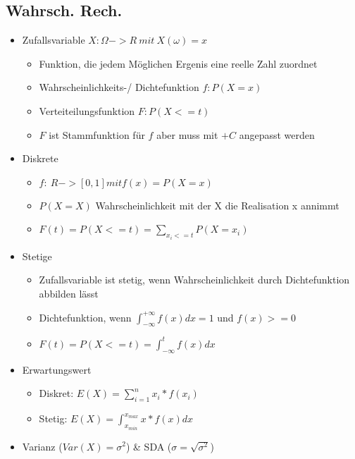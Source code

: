 \documentclass[a4paper]{article}
\begin{document}
\begin{landscape}
\begin{multicols}{4}
    \section{Wahrsch. Rech.}
    \begin{itemize}[noitemsep,nolistsep,leftmargin=*]
        \item Zufallsvariable $X : \Omega -> R\: mit\: X(\omega) = x$
        \begin{itemize}[noitemsep,nolistsep,leftmargin=*]
            \item Funktion, die jedem Möglichen Ergenis eine reelle Zahl zuordnet
            \item Wahrscheinlichkeits-/ Dichtefunktion $f: P(X =x)$
            \item Verteiteilungsfunktion $F: P(X <= t)$
            \item $F$ ist Stammfunktion für $f$ aber muss mit $+C$ angepasst werden
        \end{itemize}
        \item Diskrete
        \begin{itemize}[noitemsep,nolistsep,leftmargin=*]
            \item $f: \:R->[0,1] mit f(x)=P(X=x)$
            \item $P(X=X)$ Wahrscheinlichkeit mit der X die Realisation x annimmt
            \item $F(t) = P(X <= t) = \sum_{x_i <= t} P(X = x_i)$
        \end{itemize}
        \item Stetige
        \begin{itemize}[noitemsep,nolistsep,leftmargin=*]
            \item Zufallsvariable ist stetig, wenn Wahrscheinlichkeit durch Dichtefunktion abbilden lässt
            \item Dichtefunktion, wenn $\int^{+\infty}_{-\infty} f(x) dx = 1$ und $f(x) >= 0$
            \item $F(t) = P(X <= t) = \int^{t}_{-\infty} f(x)dx$
        \end{itemize}
        \item Erwartungswert
        \begin{itemize}[noitemsep,nolistsep,leftmargin=*]
            \item Diskret: $E(X) = \sum^n_{i=1} x_i * f(x_i)$
            \item Stetig: $E(X) = \int^{x_{max}}_{x_{min}} x * f(x) dx$
        \end{itemize}
        \item Varianz ($Var(X) = \sigma^2$) \& SDA ($\sigma = \sqrt{\sigma^2}$)

\end{itemize}
\end{multicols}
\end{landscape}
\end{document}
